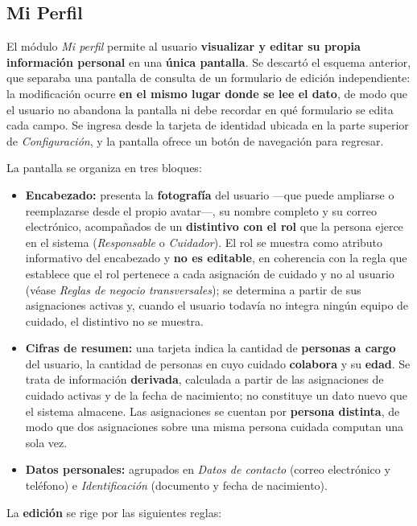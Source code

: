 \documentclass[a4paper,12pt]{article}
\begin{document}
    \subsection{Mi Perfil}
    \par El módulo \textit{Mi perfil} permite al usuario \textbf{visualizar y editar su propia información personal} en una \textbf{única pantalla}. Se descartó el esquema anterior, que separaba una pantalla de consulta de un formulario de edición independiente: la modificación ocurre \textbf{en el mismo lugar donde se lee el dato}, de modo que el usuario no abandona la pantalla ni debe recordar en qué formulario se edita cada campo. Se ingresa desde la tarjeta de identidad ubicada en la parte superior de \textit{Configuración}, y la pantalla ofrece un botón de navegación para regresar.
    \par La pantalla se organiza en tres bloques:
    \begin{itemize}
        \item \textbf{Encabezado:} presenta la \textbf{fotografía} del usuario —que puede ampliarse o reemplazarse desde el propio avatar—, su nombre completo y su correo electrónico, acompañados de un \textbf{distintivo con el rol} que la persona ejerce en el sistema (\textit{Responsable} o \textit{Cuidador}). El rol se muestra como atributo informativo del encabezado y \textbf{no es editable}, en coherencia con la regla que establece que el rol pertenece a cada asignación de cuidado y no al usuario (véase \textit{Reglas de negocio transversales}); se determina a partir de sus asignaciones activas y, cuando el usuario todavía no integra ningún equipo de cuidado, el distintivo no se muestra.
        \item \textbf{Cifras de resumen:} una tarjeta indica la cantidad de \textbf{personas a cargo} del usuario, la cantidad de personas en cuyo cuidado \textbf{colabora} y su \textbf{edad}. Se trata de información \textbf{derivada}, calculada a partir de las asignaciones de cuidado activas y de la fecha de nacimiento; no constituye un dato nuevo que el sistema almacene. Las asignaciones se cuentan por \textbf{persona distinta}, de modo que dos asignaciones sobre una misma persona cuidada computan una sola vez.
        \item \textbf{Datos personales:} agrupados en \textit{Datos de contacto} (correo electrónico y teléfono) e \textit{Identificación} (documento y fecha de nacimiento).
    \end{itemize}
    \par La \textbf{edición} se rige por las siguientes reglas:
\end{document}
